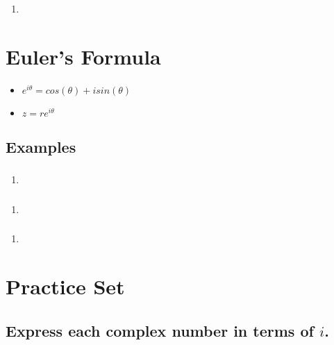 \documentclass{report}
\renewcommand{\sin}[1]{sin(#1)}
\renewcommand{\cos}[1]{cos(#1)}
\begin{document}
                \subsubsection{}
                    \begin{enumerate}
                        \item 
                    \end{enumerate}
        \section{Euler's Formula}
            \begin{itemize}
                \item $e^{i\theta}=\cos{\theta}+i\sin{\theta}$
                \item $z=re^{i\theta}$
            \end{itemize}
            \subsection{Examples}
                \subsubsection{}
                    \begin{enumerate}
                        \item 
                    \end{enumerate}
                \subsubsection{}
                    \begin{enumerate}
                        \item 
                    \end{enumerate}
                \subsubsection{}
                    \begin{enumerate}
                        \item 
                    \end{enumerate}
        \section{Practice Set}
            \subsection{Express each complex number in terms of $i$.}
\end{document}
